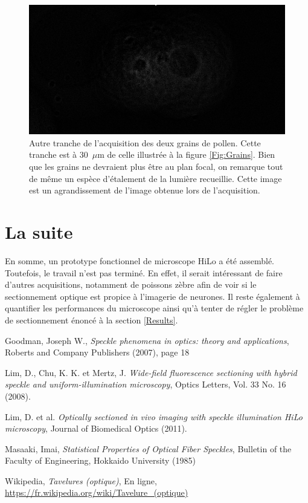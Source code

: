 \documentclass{article}       %
\begin{document}
\begin{figure}[H]
    \centering
    \includegraphics[scale=0.8]{fig/Etalement.PNG}
    \caption{Autre tranche de l'acquisition des deux grains de pollen. Cette tranche est à 30~$\mu$m de celle illustrée à la figure \ref{Fig:Grains}. Bien que les grains ne devraient plus être au plan focal, on remarque tout de même un espèce d'étalement de la lumière recueillie. Cette image est un agrandissement de l'image obtenue lors de l'acquisition.}
    \label{Fig:Etalement}
\end{figure}

\section{La suite}

En somme, un prototype fonctionnel de microscope HiLo a été assemblé. Toutefois, le travail n'est pas terminé. En effet, il serait intéressant de faire d'autres acquisitions, notamment de poissons zèbre afin de voir si le sectionnement optique est propice à l'imagerie de neurones. Il reste également à quantifier les performances du microscope ainsi qu'à tenter de régler le problème de sectionnement énoncé à la section \ref{Results}.




\newpage


\begin{thebibliography}{9}

 Goodman, Joseph W., \emph{Speckle phenomena in optics: theory and applications}, Roberts and Company Publishers (2007), page 18

 Lim, D., Chu, K. K. et Mertz, J. \emph{Wide-field fluorescence sectioning with hybrid
speckle and uniform-illumination microscopy}, Optics Letters, Vol. 33 No. 16 (2008).

 Lim, D. et al. \emph{Optically sectioned in vivo imaging with speckle
illumination HiLo microscopy}, Journal of Biomedical Optics (2011).

 Masaaki, Imai, \emph{Statistical Properties of Optical Fiber Speckles}, Bulletin of the Faculty of Engineering, Hokkaido University (1985)


 Wikipedia, \emph{Tavelures (optique)}, En ligne, \url{https://fr.wikipedia.org/wiki/Tavelure_(optique)}


\end{thebibliography}
\end{document}
